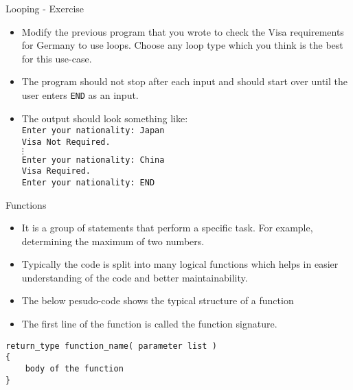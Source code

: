 \documentclass[aspectratio=169]{beamer}
\begin{document}
\begin{frame}[fragile]{Looping - Exercise}
    \begin{itemize}
        \item Modify the previous program that you wrote to check the Visa requirements for Germany to use loops. Choose any loop type which you think is the best for this use-case.
        \item The program should not stop after each input and should start over until the user enters \verb|END| as an input.
        \item The output should look something like: \\ \verb|Enter your nationality: Japan| \\ \verb|Visa Not Required.| \\ $\vdots$\\ \verb|Enter your nationality: China| \\ \verb|Visa Required.| \\ \verb|Enter your nationality: END|
    \end{itemize}
\end{frame}

\begin{frame}[fragile]{Functions}
    \begin{itemize}
        \item It is a group of statements that perform a specific task. For example, determining the maximum of two numbers.
        \item Typically the code is split into many logical functions which helps in easier understanding of the code and better maintainability.
        \item The below pesudo-code shows the typical structure of a function
        \item The first line of the function is called the function signature.
    \end{itemize}
    \begin{lstlisting}
return_type function_name( parameter list )
{
    body of the function
}
    \end{lstlisting}
\end{frame}
\end{document}
